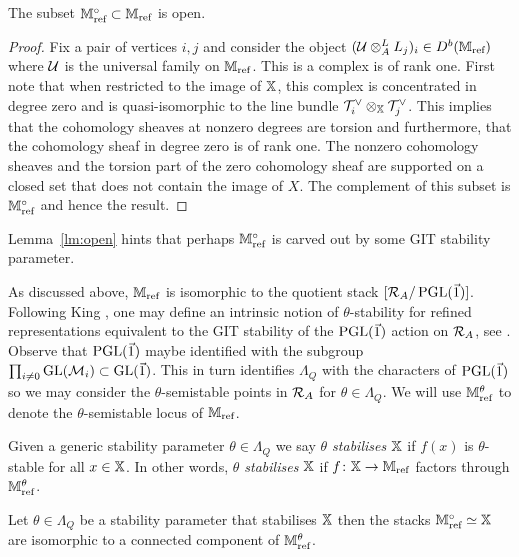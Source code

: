 \documentclass[12pt]{amsart}
\begin{document}
\begin{lemma}\label{lm:open}
The subset $\mathbb{M}_{\textup{ref}}^\circ \subset \mathbb{M}_{\textup{ref}}$ is open.
\end{lemma}

\begin{proof}
Fix a pair of vertices $i,j$ and consider the object $(\mathcal{U} \otimes^L_A L_j)_i \in D^b(\mathbb{M}_\text{ref})$ where $\mathcal{U}$ is the universal family on  $\mathbb{M}_{\text{ref}}$. This is a complex is of rank one.
First note that when restricted to the image of $\mathbb{X}$, this complex is concentrated in degree zero and is quasi-isomorphic to the line bundle $\mathcal{T}_i^{\vee} \otimes_{\mathbb{X}} \mathcal{T}_j^\vee$. This implies that the cohomology sheaves at nonzero degrees are torsion and furthermore, that the cohomology sheaf in degree zero is of rank one.
The nonzero cohomology sheaves and the torsion part of the zero cohomology sheaf are supported on a closed set that does not contain the image of $X$. The complement of this subset is $\mathbb{M}_{\text{ref}}^\circ$ and hence the result.
\end{proof}

Lemma~\ref{lm:open} hints that perhaps $\mathbb{M}^\circ_{\textup{ref}}$ is carved out by some GIT stability parameter. 

As discussed above, $\mathbb{M}_{\text{ref}}$ is isomorphic to the quotient stack $[\mathcal{R}_A/ \operatorname{PGL}(\vec{1})]$.
Following King \cite{Ki}, one may define an intrinsic notion of $\theta$-stability for refined representations equivalent to the GIT stability of the $\operatorname{PGL}(\vec{1})$ action on $\mathcal{R}_A$,  see \cite[Definition 3.4]{Abd}. 
Observe that $\operatorname{PGL}(\vec{1})$ maybe identified with the subgroup $\prod_{i\neq 0} \operatorname{GL}(\mathcal{M}_i) \subset \operatorname{GL}(\vec{1})$.
This in turn identifies $\Lambda_Q$ with the characters of $\operatorname{PGL}(\vec{1})$ so we may consider the $\theta$-semistable points in $\mathcal{R}_A$ for $\theta \in \Lambda_Q$.
We will use $\mathbb{M}_{\textup{ref}}^\theta$ to denote the $\theta$-semistable locus of $\mathbb{M}_{\textup{ref}}$.


\begin{definition}
Given a generic stability parameter $\theta \in \Lambda_Q$ we say {\em $\theta$ stabilises $\mathbb{X}$} if $f(x)$ is $\theta$-stable for all $x \in \mathbb{X}$.
In other words, {\em $\theta$ stabilises $\mathbb{X}$} if $f \colon \mathbb{X} \rightarrow \mathbb{M}_{\textup{ref}}$ factors through $\mathbb{M}_{\textup{ref}}^\theta$.
\end{definition}

\begin{theorem}\label{thm:stab}
Let $\theta \in \Lambda_Q$ be a stability parameter that stabilises $\mathbb{X}$ then the stacks $\mathbb{M}_{\textup{ref}}^\circ \simeq \mathbb{X}$ are isomorphic to a connected component of $\mathbb{M}_{\textup{ref}}^\theta$.
\end{theorem}
\end{document}
